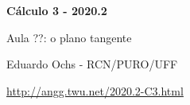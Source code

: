\documentclass[oneside,12pt]{article}
\begin{document}


\long{}
\long{}
\long{}
\long{}
\long{}
\long{}
\long{}
\long{}
\long{}
\long{}
\long{}

\long{}
\long{}

\def\frown{\ensuremath{{=}{(}}}
\def\True {\mathbf{V}}
\def\False{\mathbf{F}}
\def\D    {\displaystyle}

\def\drafturl{http://angg.twu.net/LATEX/2020-2-C3.pdf}
\def\drafturl{http://angg.twu.net/2020.2-C3.html}
\def\draftfooter{\tiny \href{\drafturl}{\jobname{}} \ColorBrown{\shorttoday{} \hours}}



%

\thispagestyle{empty}

\begin{center}

\vspace*{1.2cm}

{\bf \Large Cálculo 3 - 2020.2}

\bsk

Aula ??: o plano tangente

\bsk

Eduardo Ochs - RCN/PURO/UFF

\url{http://angg.twu.net/2020.2-C3.html}

\end{center}
\end{document}
